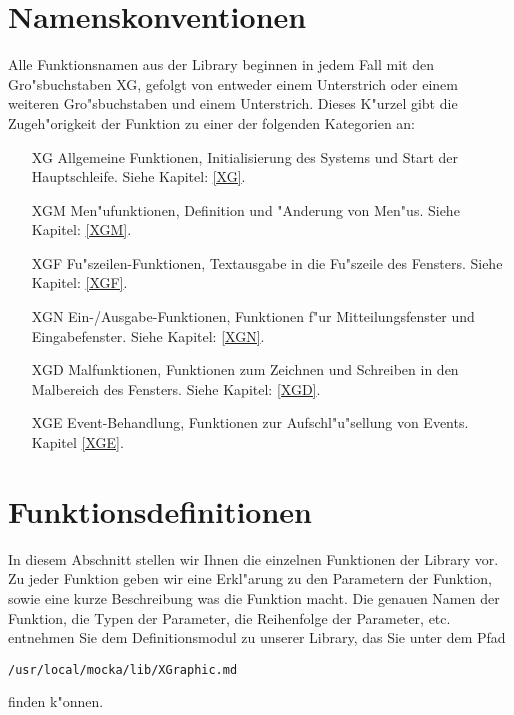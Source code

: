 \section{Namenskonventionen}
Alle Funktionsnamen aus der Library beginnen in jedem Fall mit den
Gro"sbuchstaben XG, gefolgt von entweder einem Unterstrich oder einem
weiteren Gro"sbuchstaben und einem Unterstrich. Dieses K"urzel gibt die
Zugeh"origkeit der Funktion zu einer der folgenden Kategorien an:
\begin{itemize}
   \item[XG]{Allgemeine Funktionen, Initialisierung des Systems und
       Start der Hauptschleife. Siehe Kapitel: \ref{XG}.}
   \item[XGM]{Men"ufunktionen, Definition und "Anderung von
       Men"us. Siehe Kapitel: \ref{XGM}.}
   \item[XGF]{Fu"szeilen-Funktionen, Textausgabe in die
       Fu"szeile des Fensters. Siehe Kapitel: \ref{XGF}.}
   \item[XGN]{Ein-/Ausgabe-Funktionen, Funktionen f"ur
       Mitteilungsfenster und Eingabefenster. Siehe Kapitel: \ref{XGN}.}
   \item[XGD]{Malfunktionen, Funktionen zum Zeichnen
       und Schreiben in den Malbereich des Fensters. Siehe Kapitel: \ref{XGD}.}
   \item[XGE]{Event-Behandlung, Funktionen zur Aufschl"u"sellung
       von Events. Kapitel \ref{XGE}.}
\end{itemize}





\section{Funktionsdefinitionen}
In diesem Abschnitt stellen wir Ihnen die einzelnen Funktionen der
Library vor. Zu jeder Funktion geben wir eine Erkl"arung zu den
Parametern der Funktion, sowie eine kurze Beschreibung was die
Funktion macht. Die genauen Namen der Funktion, die Typen der
Parameter, die Reihenfolge der Parameter, etc. entnehmen Sie dem
Definitionsmodul zu unserer Library, das Sie unter dem Pfad
\begin{verbatim}
/usr/local/mocka/lib/XGraphic.md
\end{verbatim}
finden k"onnen.

%
%


